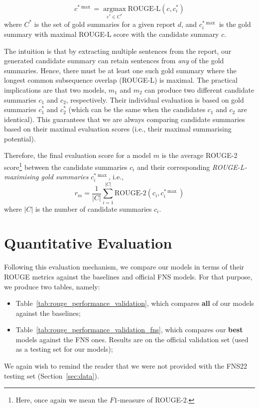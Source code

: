 \begin{equation}\label{eq:rouge_max}
    c^{*\max} = \underset{c^{*} \in C^{*}}{\operatorname{argmax}} \text{ROUGE-L}(c, c^{*}_{i})
\end{equation}
where $C^{*}$ is the set of gold summaries for a given report $d$, and $c^{*\max}_{i}$ is the gold summary with maximal ROUGE-L score with the candidate summary $c$.

The intuition is that by extracting multiple sentences from the report, our generated candidate summary can
retain sentences from \emph{any} of the gold summaries.
Hence, there must be at least one such gold summary where the longest common subsequence overlap (ROUGE-L) is maximal.
The practical implications are that two models, $m_{1}$ and $m_{2}$ can produce two different candidate summaries
$c_{1}$ and $c_{2}$, respectively.
Their individual evaluation is based on gold summaries $c^{*}_{1}$ and $c^{*}_{2}$ (which can be the same when the
candidates $c_{1}$ and $c_{2}$ are identical).
This guarantees that we are always comparing candidate summaries based on their maximal evaluation scores (i.e., their maximal summarising potential).

Therefore, the final evaluation score for a model $m$ is the average ROUGE-2 score\footnote{
    Here, once again we mean the $F1$-measure of ROUGE-2.
} between the candidate summaries $c_{i}$ and their corresponding \emph{ROUGE-L-maximising gold summaries} $c^{*\max}_{i}$, i.e.,
\begin{equation}\label{eq:rouge_final}
    r_{m} = \frac{1}{|C|} \sum_{i=1}^{|C|} \text{ROUGE-2}(c_{i}, c^{*\max}_{i})
\end{equation}
where $|C|$ is the number of candidate summaries $c_{i}$.

\section{Quantitative Evaluation}\label{sec:quantitative-evaluation}
Following this evaluation mechanism, we compare our models in terms of their ROUGE metrics against the baselines and official FNS models.
For that purpose, we produce two tables, namely:
\begin{itemize}
    \item Table~\ref{tab:rouge_performance_validation}, which compares \textbf{all} of our models against the baselines;
    \item Table~\ref{tab:rouge_performance_validation_fns}, which compares our \textbf{best} models against the FNS ones.
    Results are on the official validation set (used as a testing set for our models);
\end{itemize}
We again wish to remind the reader that we were not provided with the FNS22 testing set (Section~\ref{sec:data}).

